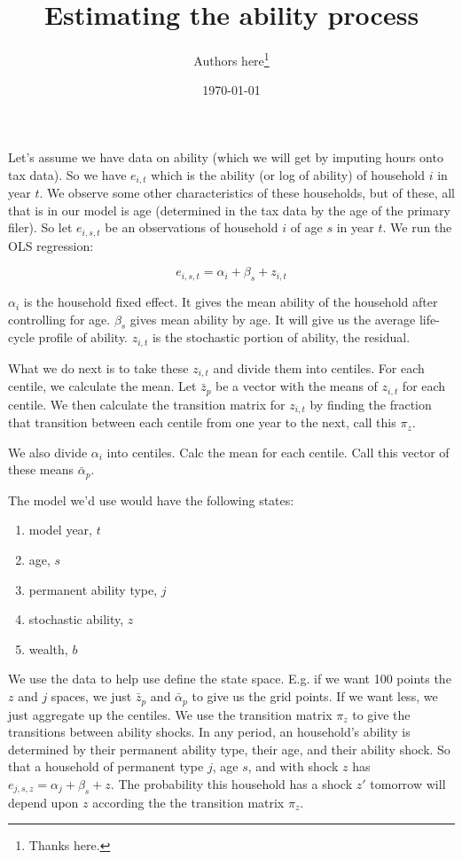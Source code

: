 \documentclass[article,11pt,letterpaper,fleqn]{article}
\author{Authors here\thanks{Thanks here.}}
\title{Estimating the ability process}
\date{\today}
\theoremstyle{definition}
\numberwithin{equation}{section}
\begin{document}

\maketitle

Let's assume we have data on ability (which we will get by imputing hours onto tax data).  So we have $e_{i,t}$ which is the ability (or log of ability) of household $i$ in year $t$.  We observe some other characteristics of these households, but of these, all that is in our model is age (determined in the tax data by the age of the primary filer).  So let $e_{i,s,t}$ be an observations of household $i$ of age $s$ in year $t$.  We run the OLS regression:

\begin{equation}
\label{eqn:ols}
e_{i,s,t} = \alpha_{i} + \beta_{s} + z_{i,t}
\end{equation}

$\alpha_{i}$ is the household fixed effect.  It gives the mean ability of the household after controlling for age.  $\beta_{s}$ gives mean ability by age. It will give us the average life-cycle profile of ability.  $z_{i,t}$ is the stochastic portion of ability, the residual.

What we do next is to take these $z_{i,t}$ and divide them into centiles.  For each centile, we calculate the mean.  Let $\bar{z}_{p}$ be a vector with the means of $z_{i,t}$ for each centile.  We then calculate the transition matrix for $z_{i,t}$ by finding the fraction that transition between each centile from one year to the next, call this $\pi_{z}$.  

We also divide $\alpha_{i}$ into centiles.  Calc the mean for each centile.  Call this vector of these means $\bar{\alpha}_{p}$.

The model we'd use would have the following states:
\begin{enumerate}
\item model year, $t$
\item age, $s$
\item permanent ability type, $j$
\item stochastic ability, $z$
\item wealth, $b$
\end{enumerate}

We use the data to help use define the state space.  E.g. if we want 100 points the $z$ and $j$ spaces, we just $\bar{z}_{p}$ and $\bar{\alpha}_{p}$ to give us the grid points.  If we want less, we just aggregate up the centiles.  We use the transition matrix $\pi_{z}$ to give the transitions between ability shocks.   In any period, an household's ability is determined by their permanent ability type, their age, and their ability shock.  So that a household of permanent type $j$, age $s$, and with shock $z$ has $e_{j,s,z}=\alpha_{j} + \beta_{s} + z$.  The probability this household has a shock $z'$ tomorrow will depend upon $z$ according the the transition matrix $\pi_{z}$.
\end{document}

